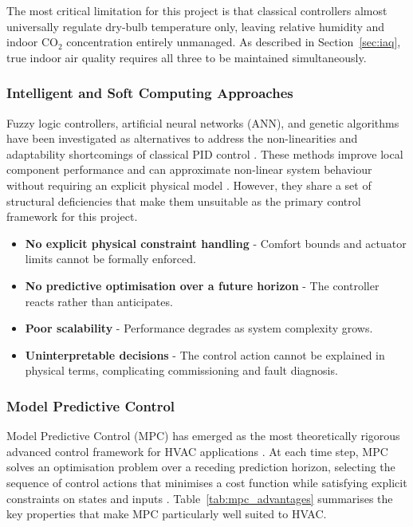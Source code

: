 \documentclass[12pt, a4paper]{article}
\begin{document}
	The most critical limitation for this project is that classical controllers almost universally regulate dry-bulb temperature only, leaving relative humidity and indoor CO$_2$ concentration entirely unmanaged. As described in Section~\ref{sec:iaq}, true indoor air quality requires all three to be maintained simultaneously.
	
	\subsubsection{Intelligent and Soft Computing Approaches}
	
	Fuzzy logic controllers, artificial neural networks (ANN), and genetic algorithms have been investigated as alternatives to address the non-linearities and adaptability shortcomings of classical PID control \citep{singhFuzzyModelingControl2009, kalogirouArtificialNeuralNetworks2009, dounisAdvancedControlSystems2009}. These methods improve local component performance and can approximate non-linear system behaviour without requiring an explicit physical model \citep{naiduAdvancedControlStrategies2011}. However, they share a set of structural deficiencies that make them unsuitable as the primary control framework for this project.
	
	\begin{itemize}
		\item \textbf{No explicit physical constraint handling} - Comfort bounds and actuator limits cannot be formally enforced.
		\item\textbf{ No predictive optimisation over a future horizon }- The controller reacts rather than anticipates.
		\item \textbf{Poor scalability} - Performance degrades as system complexity grows.
		\item \textbf{Uninterpretable decisions} - The control action cannot be explained in physical terms, complicating commissioning and fault diagnosis.
	\end{itemize}
	
	\subsubsection{Model Predictive Control}
	
	Model Predictive Control (MPC) has emerged as the most theoretically rigorous advanced control framework for HVAC applications \citep{aframTheoryApplicationsHVAC2014, wangSupervisoryOptimalControl2008}. At each time step, MPC solves an optimisation problem over a receding prediction horizon, selecting the sequence of control actions that minimises a cost function while satisfying explicit constraints on states and inputs \citep{camachoModelPredictiveControl2007, qinSurveyIndustrialModel2003}. Table~\ref{tab:mpc_advantages} summarises the key properties that make MPC particularly well suited to HVAC.
	
\end{document}
